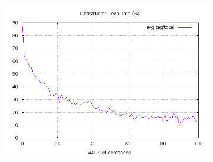 \documentclass[10pt,a4paper]{article}
\begin{document}
\begin{figure}[h]
\begin{subfigure}[t]{0.3\textwidth}
        \includegraphics[width=\textwidth]{const_eval_frac}
        \caption{}
    \end{subfigure}


\end{figure}
\end{document}
